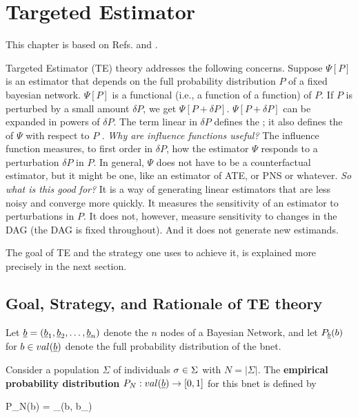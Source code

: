 \chapter{Targeted Estimator}
\label{ch-targeted-est}

\newcommand{\dpsi}[0]{\nabla\Psi}
\newcommand{\hatl}[0]{\HAT{\call}}

This chapter is based on Refs.\cite{tlride} and  \cite{hoff}.

Targeted Estimator (TE) theory  addresses
the following concerns.
Suppose $\Psi[P]$ is an estimator that depends on the full probability distribution $P$ of a fixed bayesian network.
$\Psi[P]$ is a functional (i.e., a function of a function) of $P$. If $P$ is perturbed by a small amount $\delta P$, we get $\Psi[P+\delta P]$. $\Psi[P + \delta P]$ can be expanded in powers of $\delta P$.
The term linear  in $\delta P$ defines the ; it
also defines the   of $\Psi$ with respect to $P$
. {\it Why are influence functions useful?}
 The influence function measures,
 to first order in $\delta P$, how the estimator $\Psi$ responds to a perturbation
 $\delta P$ in $P$. In general, $\Psi$ does not have to be a counterfactual estimator, but it might be one, like an estimator of ATE, or PNS or whatever.
{\it So what is this good for?} It is a way of generating linear
 estimators
that are less noisy
and converge more quickly. It measures the sensitivity of an estimator to perturbations in $P$. It does not, however, measure sensitivity to changes in the DAG (the DAG is fixed throughout). And it does not generate new estimands.

The goal of TE and
the strategy one uses to achieve it, is
explained more precisely in the next section.




\section{Goal, Strategy, and Rationale of TE theory}


Let $\rvb = (\rvb_1, \rvb_2, \ldots, \rvb_{n})$ denote
the $n$ nodes of a Bayesian Network, and let $P_\rvb(b)$ for $b\in val(\rvb)$
denote the full probability distribution of the bnet.

 Consider a population $\Sigma$ of
 individuals $\sigma\in \Sigma$ with $N=|\Sigma|$.
 The {\bf empirical probability distribution}
 $P_N:val(\rvb) \rarrow [0,1]$ for this bnet is defined by

\beq
P_N(b) = \sum_\s\delta(b, b_\s)
\eeq

